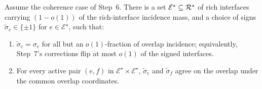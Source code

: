 \begin{lemma}\label{lem:sign-consistency}
Assume the coherence case of Step~6.
There is a set $\mathcal{E}^\star\subseteq\mathcal{R}^\star$ of rich
interfaces carrying $(1-o(1))$ of the rich-interface incidence mass,
and a choice of signs
$\widetilde\sigma_e\in\{\pm1\}$ for $e\in\mathcal{E}^\star$, such that:
\begin{enumerate}[nosep]
  \item $\widetilde\sigma_e = \sigma_e$ for all but an $o(1)$-fraction
    of overlap incidence; equivalently, Step~7's corrections flip at
    most $o(1)$ of the signed interfaces.
  \item For every active pair $(e,f)$ in $\mathcal{E}^\star\times
    \mathcal{E}^\star$, $\widetilde\sigma_e$ and $\widetilde\sigma_f$
    agree on the overlap under the common overlap coordinates.
\end{enumerate}
\end{lemma}

